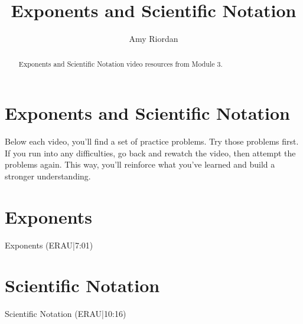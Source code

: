 \documentclass{ximera}
\title{Exponents and Scientific Notation}
\author{Amy Riordan}
\begin{document}
\begin{abstract}
Exponents and Scientific Notation video resources from Module 3.
\end{abstract}
\maketitle

\section*{Exponents and Scientific Notation}

Below each video, you’ll find a set of practice problems. Try those problems first. If you run into any difficulties, go back and rewatch the video, then attempt the problems again. This way, you’ll reinforce what you’ve learned and build a stronger understanding.

\section*{Exponents}

Exponents (ERAU|7:01)




\section*{Scientific Notation}

Scientific Notation (ERAU|10:16)

\end{document}
